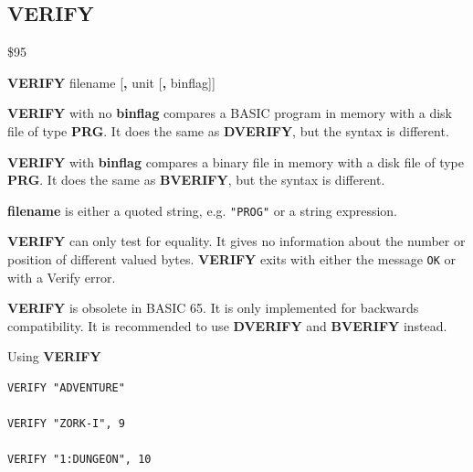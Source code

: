 \subsection{VERIFY}
\begin{description}[leftmargin=2cm,style=nextline]
\item [Token:]    \$95

\item [Format:]   {\bf VERIFY} filename [{\bf,} unit [{\bf,} binflag]]

\item [Usage:]    {\bf VERIFY} with no {\bf binflag} compares a BASIC program in memory with a disk file of type {\bf PRG}. It does the same as {\bf DVERIFY}, but the syntax is different.

                  {\bf VERIFY} with {\bf binflag} compares a binary file in memory with a disk file of type {\bf PRG}. It does the same as {\bf BVERIFY}, but the syntax is different.

                  {\bf filename} is either a quoted string, e.g. \texttt{"PROG"} or a string expression.

                  \unitdefinition

\item [Remarks:]  {\bf VERIFY} can only test for equality. It gives no information about the number or position of different valued bytes. {\bf VERIFY} exits with either the message \texttt{OK} or with a Verify error.

                  {\bf VERIFY} is obsolete in BASIC 65. It is only implemented for backwards compatibility. It is recommended to use {\bf DVERIFY} and {\bf BVERIFY} instead.

\item [Examples:] Using {\bf VERIFY}

\begin{tcolorbox}[colback=black,coltext=white]
\verbatimfont{\codefont}
\begin{verbatim}
VERIFY "ADVENTURE"

VERIFY "ZORK-I", 9

VERIFY "1:DUNGEON", 10
\end{verbatim}
\end{tcolorbox}
\end{description}


\newpage
